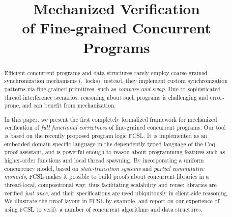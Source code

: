 \documentclass[runningheads]{llncs}
\begin{document}




\title{
Mechanized Verification\\ 
of Fine-grained Concurrent Programs 
}
 


\author{}
\institute{}

\maketitle

\begin{abstract}

  Efficient concurrent programs and data structures rarely employ
  coarse-grained synchronization mechanisms (\ie,~locks); instead,
  they implement custom synchronization patterns via fine-grained
  primitives, such as \emph{compare-and-swap}.
  Due to sophisticated thread interference scenarios, reasoning about
  such programs is challenging and error-prone, and can benefit from
  mechanization.
  
  In this paper, we present the first completely formalized framework for
  mechanized verification of \emph{full functional correctness} of
  fine-grained concurrent programs. Our tool is based on the recently
  proposed program logic FCSL.
  It is implemented as an embedded domain-specific language in the
  dependently-typed language of the Coq proof assistant, and is
  powerful enough to reason about programming features such as
  higher-order functions and local thread spawning. By incorporating a
  uniform concurrency model, based on \emph{state-transition systems}
  and \emph{partial commutative monoids}, FCSL makes it possible to
  build proofs about concurrent libraries in a thread-local,
  compositional way, thus facilitating scalability and reuse:
  libraries are verified \emph{just once}, and their specifications
  are used ubiquitously in client-side reasoning.
  We illustrate the proof layout in FCSL by example, and report on
  our experience of using FCSL to verify a number of concurrent
  algorithms and data structures.

\end{abstract}















\end{document}
